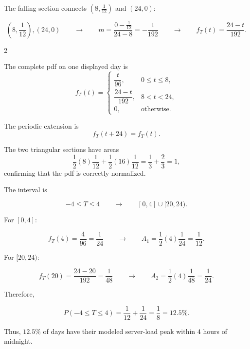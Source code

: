	The falling section connects
	$\left(8,\frac1{12}\right)$ and $(24,0)$:
	
	$$
	\left(8,\frac1{12}\right),(24,0)
	\qquad\longrightarrow\qquad
	m=\frac{0-\frac1{12}}{24-8}
	=-\frac1{192}
	\qquad\longrightarrow\qquad
	f_T(t)=\frac{24-t}{192}.
	$$
	
	
	\setlength{\columnseprule}{0.4pt}
	\begin{multicols}{2}
		
		The complete pdf on one displayed day is
		\[
		f_T(t)=
		\begin{cases}
			\dfrac{t}{96},&0\le t\le8,\\[2mm]
			\dfrac{24-t}{192},&8<t<24,\\[2mm]
			0,&\text{otherwise}.
		\end{cases}
		\]
		
		\columnbreak
		
		The periodic extension is
		\[
		f_T(t+24)=f_T(t).
		\]
		
		The two triangular sections have areas
		\[
		\frac12(8)\frac1{12}
		+
		\frac12(16)\frac1{12}
		=
		\frac13+\frac23
		=1,
		\]
		confirming that the pdf is correctly normalized.
		
		
	\end{multicols}
	\setlength{\columnseprule}{0pt}
	
	The interval is
	
	
	$$
	-4\le T\le4
	\qquad\longrightarrow\qquad
	[0,4]\cup[20,24).
	$$
	
	For $[0,4]$:
	
	$$
	f_T(4)=\frac4{96}=\frac1{24}
	\qquad\longrightarrow\qquad
	A_1=\frac12(4)\frac1{24}
	=\frac1{12}.
	$$
	
	For $[20,24)$:
	
	$$
	f_T(20)=\frac{24-20}{192}
	=\frac1{48}
	\qquad\longrightarrow\qquad
	A_2=\frac12(4)\frac1{48}
	=\frac1{24}.
	$$
	
	Therefore,
	
	$$
	P(-4\le T\le4)
	=
	\frac1{12}+\frac1{24}
	=
	\frac18
	=
	12.5\%.
	$$
	
	Thus, $12.5\%$ of days have their modeled server-load peak within
	$4$ hours of midnight.
	
	


